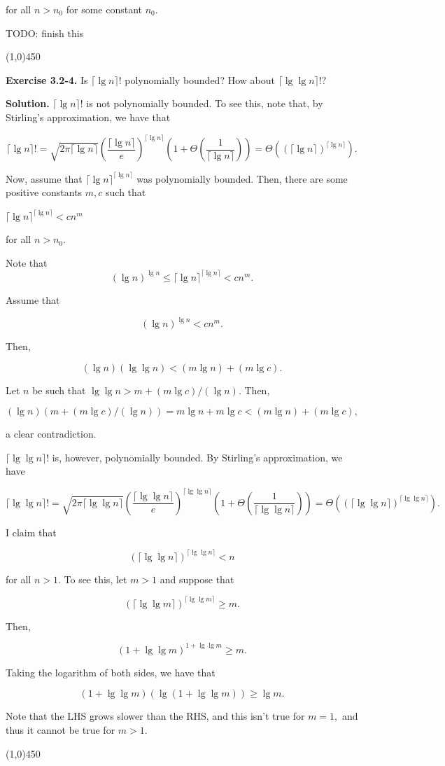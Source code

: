 \documentclass{article}
\newcommand{\exec}[2]
{\textbf{Exercise #1.} #2

\textbf{Solution.}}
\newcommand{\bardiv}{\begin{center}
\line(1,0){450}
\end{center}}
\begin{document}
for all $n > n_0$ for some constant $n_0.$

TODO: finish this

\bardiv

\exec{3.2-4}{Is $\lceil \lg n\rceil !$ polynomially bounded? How about $\lceil \lg \lg n\rceil !?$}
$\lceil \lg n\rceil !$ is not polynomially bounded. To see this, note that, by Stirling's approximation, we have that

$$\lceil \lg n\rceil ! = \sqrt{2\pi \lceil \lg n\rceil} \left(\frac{\lceil \lg n\rceil}{e}\right)^{\lceil \lg n\rceil}\left(1+\Theta\left(\frac{1}{\lceil \lg n\rceil}\right)\right) = \Theta((\lceil \lg n \rceil)^{\lceil \lg n\rceil}).$$

Now, assume that $\lceil \lg n\rceil^{\lceil \lg n\rceil}$ was polynomially bounded. Then, there are some positive constants $m, c$ such that 

$\lceil \lg n\rceil^{\lceil \lg n\rceil} < cn^m$

for all $n > n_0.$

Note that $$(\lg n)^{\lg n} \leq \lceil \lg n\rceil^{\lceil \lg n\rceil} < cn^m.$$

Assume that

$$(\lg n)^{\lg n} < cn^m.$$

Then, 

$$(\lg n)(\lg \lg n) < (m \lg n) + (m \lg c).$$

Let $n$ be such that $\lg \lg n > m + (m\lg c)/(\lg n).$ Then,

$$(\lg n)(m + (m\lg c)/(\lg n)) = m\lg n + m \lg c < (m\lg n) + (m\lg c),$$

a clear contradiction.

$\lceil \lg \lg n\rceil!$ is, however, polynomially bounded. By Stirling's approximation, we have

$$\lceil \lg \lg n\rceil! = \sqrt{2\pi \lceil \lg \lg n\rceil} \left(\frac{\lceil \lg \lg n\rceil}{e}\right)^{\lceil \lg \lg n\rceil}\left(1+\Theta\left(\frac{1}{\lceil \lg \lg n\rceil}\right)\right) = \Theta((\lceil \lg\lg n \rceil)^{\lceil \lg \lg n\rceil}).$$

I claim that

$$(\lceil \lg\lg n\rceil)^{\lceil \lg\lg n\rceil} < n$$

for all $n > 1.$ To see this, let $m > 1$ and suppose that 

$$(\lceil \lg\lg m\rceil)^{\lceil \lg\lg m\rceil} \geq m.$$

Then,

$$(1 + \lg\lg m)^{1 + \lg\lg m} \geq m.$$

Taking the logarithm of both sides, we have that

$$(1+\lg\lg m)(\lg(1+\lg\lg m)) \geq \lg m.$$

Note that the LHS grows slower than the RHS, and this isn't true for $m=1,$ and thus it cannot be true for $m > 1.$

\bardiv
\end{document}
